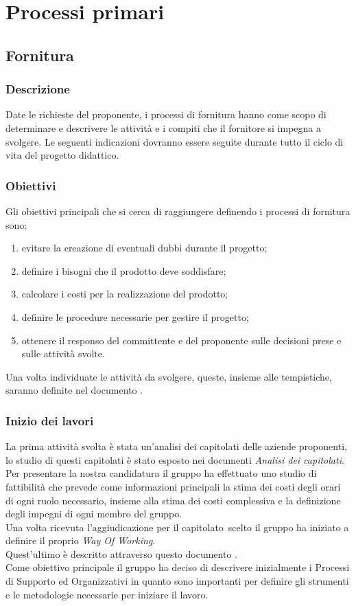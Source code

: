 \section{Processi primari} 

\subsection{Fornitura} 
\subsubsection{Descrizione}
Date le richieste del proponente, i processi di fornitura hanno come scopo di determinare e descrivere le attività e i compiti che il fornitore si impegna a svolgere.
Le seguenti indicazioni dovranno essere seguite durante tutto il ciclo di vita del progetto didattico.

\subsubsection{Obiettivi} 
Gli obiettivi principali che si cerca di raggiungere definendo i processi di fornitura sono: 
\begin{enumerate}
    \item evitare la creazione di eventuali dubbi durante il progetto; 
    \item definire i bisogni che il prodotto deve soddisfare; 
    \item calcolare i costi per la realizzazione del prodotto; 
    \item definire le procedure necessarie per gestire il progetto; 
    \item ottenere il responso del committente e del proponente sulle decisioni prese e sulle attività svolte.
\end{enumerate}
Una volta individuate le attività da svolgere, queste, insieme alle tempistiche, 
saranno definite nel documento \PdPdocumento.


\subsubsection{Inizio dei lavori} 
La prima attività svolta è stata un'analisi dei capitolati delle aziende proponenti, lo studio di questi capitolati è stato esposto nei documenti \textit{Analisi dei capitolati}. \\
Per presentare la nostra candidatura il gruppo ha effettuato uno studio di fattibilità che 
prevede come informazioni principali la stima dei costi degli orari di ogni ruolo necessario, 
insieme alla stima dei costi complessiva e la definizione degli impegni di ogni membro del gruppo. \\
Una volta ricevuta l'aggiudicazione per il capitolato\glo\ scelto il gruppo ha iniziato a definire il proprio \textit{Way Of Working}. \\
Quest'ultimo è descritto attraverso questo documento \NdPdocumento. \\
Come obiettivo principale il gruppo ha deciso di descrivere inizialmente i Processi di Supporto ed Organizzativi in quanto sono 
importanti per definire gli strumenti e le metodologie necessarie per iniziare il lavoro. 


